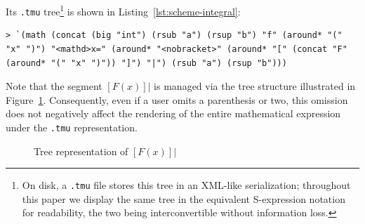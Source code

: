 Its \texttt{.tmu} tree\footnote{On disk, a \texttt{.tmu} file stores this tree in an XML-like serialization; throughout this paper we display the same tree in the equivalent S-expression notation for readability, the two being interconvertible without information loss.} is shown in Listing~\ref{lst:scheme-integral}:
\begin{lstlisting}[caption={The \texttt{.tmu} tree of the integral, in S-expression notation},label={lst:scheme-integral},upquote=true]
> `(math (concat (big "int") (rsub "a") (rsup "b") "f" (around* "(" "x" ")") "<mathd>x=" (around* "<nobracket>" (around* "[" (concat "F" (around* "(" "x" ")")) "]") "|") (rsub "a") (rsup "b")))
\end{lstlisting}

Note that the segment $\left[ F(x) \right] |$ is managed via the tree structure illustrated in Figure~\ref{fig:tree-representation}. Consequently, even if a user omits a parenthesis or two, this omission does not negatively affect the rendering of the entire mathematical expression under the \texttt{.tmu} representation.

\begin{figure}[htbp]
    \vspace{-4mm}
    \centering
    \small
    \caption{Tree representation of $ [F (x)] |$}
    \label{fig:tree-representation}
\end{figure}

